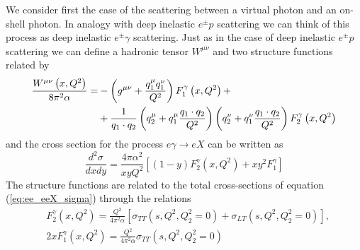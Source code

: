 \documentclass[preprint, 12pt]{elsarticle}
\begin{document}
We consider first the case of the scattering between a virtual photon and an on-shell photon. In analogy with deep inelastic $e^{\pm} p$ scattering we can think of this process as deep inelastic $e^{\pm} \gamma$ scattering. Just as in the case of deep inelastic $e^{\pm} p$ scattering we can define a hadronic tensor $W^{\mu \nu}$ and two structure functions related by
\begin{align}
\frac{W^{\mu \nu}\left(x, Q^2\right)}{8 \pi^2 \alpha} = &- \left( g^{\mu \nu} + \frac{q_1^\mu q_1^\nu}{Q^2}\right) F_1^\gamma\left(x, Q^2\right) + \notag \\
& + \frac{1}{q_1 \cdot q_2} \left( q_2^\mu + q_1^\mu \frac{q_1 \cdot q_2}{Q^2} \right) \left( q_2^\nu + q_1^\nu \frac{q_1 \cdot q_2}{Q^2} \right) F_2^\gamma \left(x, Q^2\right)
\end{align}
and the cross section for the process $e \gamma \rightarrow e X$ can be written as
\begin{equation}
\frac{d^2 \sigma}{dx dy} = \frac{4 \pi \alpha ^2}{x y Q^2} \left[ \left(1-y\right) F_2^\gamma\left(x, Q^2\right) + x y^2 F^\gamma_1 \right]
\end{equation}
The structure functions are related to the total cross-sections of equation (\ref{eq:ee_eeX_sigma}) through the relations
\begin{align}
	\label{eq:F2_def}
	&F_2^{\gamma} \left(x, Q^2\right) = \frac{Q^2}{4 \pi^2 \alpha} \left[ \sigma_{TT}\left(s, Q^2, Q_2^2 = 0\right) +   \sigma_{LT}\left(s, Q^2, Q_2^2 = 0\right)\right] , \\
	&2 xF_1^{\gamma} \left(x, Q^2\right) = \frac{Q^2}{4 \pi^2 \alpha} \sigma_{TT}\left(s, Q^2, Q_2^2 = 0\right)
\end{align}
\end{document}

